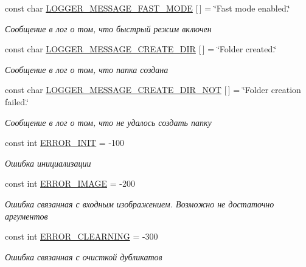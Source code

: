 \begin{DoxyCompactItemize}
const char \mbox{\hyperlink{namespaceyenot_a23d265aa1784a96ebe7ce76bedd308a6}{L\+O\+G\+G\+E\+R\+\_\+\+M\+E\+S\+S\+A\+G\+E\+\_\+\+F\+A\+S\+T\+\_\+\+M\+O\+DE}} \mbox{[}$\,$\mbox{]} = \char`\"{}Fast mode enabled.\char`\"{}
\begin{DoxyCompactList}\small\item\em Сообщение в лог о том, что быстрый режим включен \end{DoxyCompactList}\item 
const char \mbox{\hyperlink{namespaceyenot_ace626bb1b7477b39cf2864aa0d0924e9}{L\+O\+G\+G\+E\+R\+\_\+\+M\+E\+S\+S\+A\+G\+E\+\_\+\+C\+R\+E\+A\+T\+E\+\_\+\+D\+IR}} \mbox{[}$\,$\mbox{]} = \char`\"{}Folder created.\char`\"{}
\begin{DoxyCompactList}\small\item\em Сообщение в лог о том, что папка создана \end{DoxyCompactList}\item 
const char \mbox{\hyperlink{namespaceyenot_ae73ee066dad5c6455cb406ab3aa0473f}{L\+O\+G\+G\+E\+R\+\_\+\+M\+E\+S\+S\+A\+G\+E\+\_\+\+C\+R\+E\+A\+T\+E\+\_\+\+D\+I\+R\+\_\+\+N\+OT}} \mbox{[}$\,$\mbox{]} = \char`\"{}Folder creation failed.\char`\"{}
\begin{DoxyCompactList}\small\item\em Сообщение в лог о том, что не удалось создать папку \end{DoxyCompactList}\item 
const int \mbox{\hyperlink{namespaceyenot_a8206ed93e65c9e89395c2823a5f18786}{E\+R\+R\+O\+R\+\_\+\+I\+N\+IT}} = -\/100
\begin{DoxyCompactList}\small\item\em Ошибка инициализации \end{DoxyCompactList}\item 
const int \mbox{\hyperlink{namespaceyenot_a3c1c146cfa3fc68ce0e1950b93270849}{E\+R\+R\+O\+R\+\_\+\+I\+M\+A\+GE}} = -\/200
\begin{DoxyCompactList}\small\item\em Ошибка связанная с входным изображением. Возможно не достаточно аргументов \end{DoxyCompactList}\item 
const int \mbox{\hyperlink{namespaceyenot_a9b11e5890ebee4b3ace81f058483b7af}{E\+R\+R\+O\+R\+\_\+\+C\+L\+E\+A\+R\+N\+I\+NG}} = -\/300
\begin{DoxyCompactList}\small\item\em Ошибка связанная с очисткой дубликатов \end{DoxyCompactList}\item 

\end{DoxyCompactItemize}
